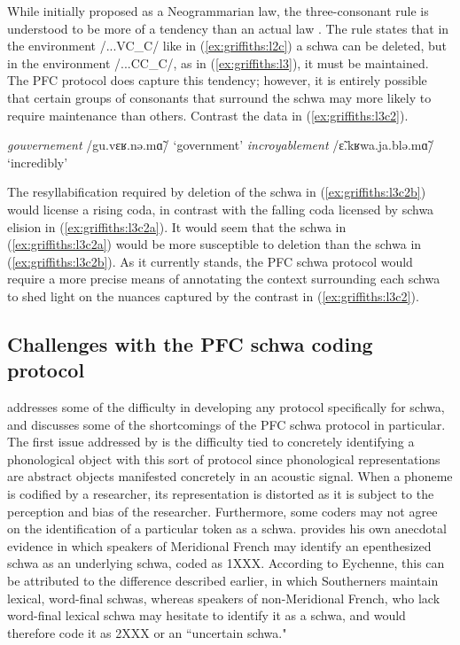 \documentclass[output=paper,colorlinks,citecolor=brown,
]{langscibook}
\begin{document}
While initially proposed as a Neogrammarian law, the three-consonant rule is understood to be more of a tendency than an actual law \citep{laks2}. The rule states that in the environment /...VC\_C/ like in (\ref{ex:griffiths:l2c}) a schwa can be deleted, but in the environment /...CC\_C/, as in (\ref{ex:griffiths:l3}), it must be maintained. The PFC protocol does capture this tendency; however, it is entirely possible that certain groups of consonants that surround the schwa may more likely to require maintenance than others.  Contrast the data in (\ref{ex:griffiths:l3c2}).
\begin{exe}
\ex\label{ex:griffiths:l3c2} \begin{xlist}
\ex\label{ex:griffiths:l3c2a} \textit{gouvernement} /gu.vɛʁ.nə.mɑ̃/ `government'
\ex\label{ex:griffiths:l3c2b} \textit{incroyablement} /ɛ̃.kʁwa.ja.blə.mɑ̃/ `incredibly'
\end{xlist}
\end{exe}
The resyllabification required by deletion of the schwa in (\ref{ex:griffiths:l3c2b}) would license a rising coda, in contrast with the falling coda licensed by schwa elision in (\ref{ex:griffiths:l3c2a}). It would seem that the schwa in (\ref{ex:griffiths:l3c2a}) would be more susceptible to deletion than the schwa in (\ref{ex:griffiths:l3c2b}). As it currently stands, the PFC schwa protocol would require a more precise means of annotating the context surrounding each schwa to shed light on the nuances captured by the contrast in (\ref{ex:griffiths:l3c2}).

\subsection{Challenges with the PFC schwa coding protocol}
\label{sec:griffiths:issues}
\citet{lyche} addresses some of the difficulty in developing any protocol specifically for schwa, and \citet{eychenne} discusses some of the shortcomings of the PFC schwa protocol in particular.  The first issue addressed by \citet[42]{eychenne} is the difficulty tied to concretely identifying a phonological object with this sort of protocol since phonological representations are abstract objects manifested concretely in an acoustic signal. When a phoneme is codified by a researcher, its representation is distorted as it is subject to the perception and bias of the researcher.  Furthermore, some coders may not agree on the identification of a particular token as a schwa.  \citeauthor{eychenne} provides his own anecdotal evidence in which speakers of Meridional French may identify an epenthesized schwa as an underlying schwa, coded as 1XXX. According to Eychenne, this can be attributed to the difference described earlier, in which Southerners maintain lexical, word-final schwas, whereas speakers of non-Meridional French, who lack word-final lexical schwa may hesitate to identify it as a schwa, and would therefore code it as 2XXX or an ``uncertain schwa."
\end{document}
